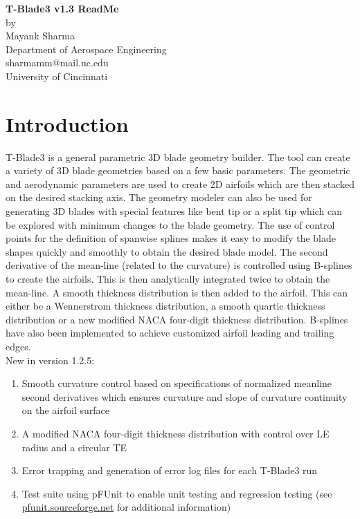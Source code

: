 \documentclass[8pt]{article}
\begin{document}
\begin{center}
\textbf{\large T-Blade3 v1.3 ReadMe}\\
by\\
Mayank Sharma\\
Department of Aerospace Engineering\\
sharmamm@mail.uc.edu\\
University of Cincinnati\\
[1cm]
\end{center}

\section{Introduction}
\noindent
T-Blade3 is a general parametric 3D blade geometry builder\cite{KiranPaper}. The tool can create a variety of 3D blade geometries based on a few basic parameters. The geometric and aerodynamic parameters are used to create 2D airfoils which are then stacked on the desired stacking axis\cite{KiranThesis}. The geometry modeler can also be  used for generating 3D blades with special features like bent tip or a split tip\cite{AbhayThesis} which can be explored with minimum changes to the blade geometry. The use of control points for the definition of spanwise splines makes it easy to modify the blade shapes quickly and smoothly to obtain the desired blade model\cite{SyedPaper}. The second derivative of the mean-line (related to the curvature) is controlled using B-splines to create the airfoils. This is then analytically integrated twice to obtain the mean-line\cite{AhmedPaper}. A smooth thickness distribution is then added to the airfoil. This can either be a Wennerstrom thickness distribution\cite{WennerstromBook}, a smooth quartic thickness distribution or a new modified NACA four-digit thickness distribution\cite{AbbottText}. B-splines have also been implemented to achieve customized airfoil leading and trailing edges.\\

\noindent
New in version 1.2.5:

\begin{enumerate}[leftmargin=*]
    \item Smooth curvature control based on specifications of normalized meanline second derivatives which ensures curvature and slope of curvature continuity on the airfoil surface
    \item A modified NACA four-digit thickness distribution with control over LE radius and a circular TE
    \item Error trapping and generation of error log files for each T-Blade3 run
    \item Test suite using pFUnit to enable unit testing and regression testing (see \url{pfunit.sourceforge.net} for additional information)
\end{enumerate}
\end{document}
